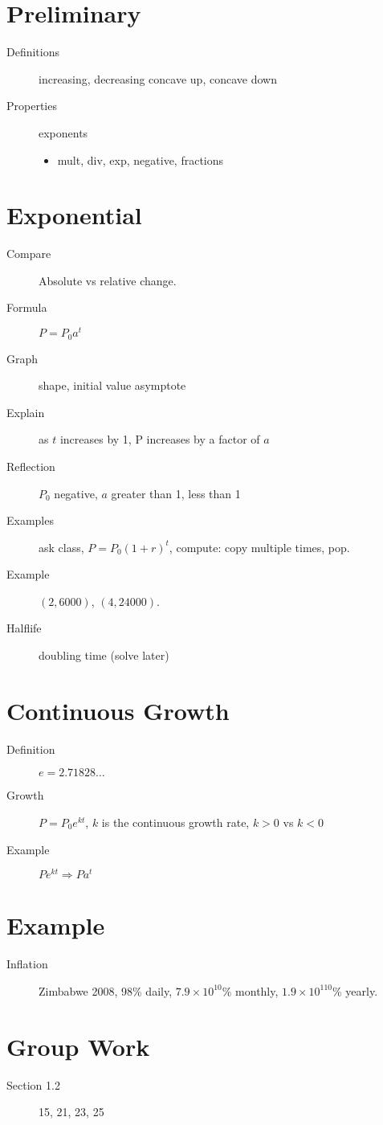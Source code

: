 \documentclass[11pt]{article}
\begin{document}
\drawtitle

\section*{Preliminary}
\begin{description}
\item[Definitions] increasing, decreasing concave up, concave down
\item[Properties] exponents
  \begin{itemize}
  \item mult, div, exp, negative, fractions
  \end{itemize}
\end{description}

\section*{Exponential}
\begin{description}
\item[Compare] Absolute vs relative change.
\item[Formula] $P=P_0a^t$
\item[Graph] shape, initial value asymptote
\item[Explain] as $t$ increases by 1, P increases by a factor of $a$
\item[Reflection] $P_0$ negative, $a$ greater than 1, less than 1
\item[Examples] ask class, $P=P_0(1+r)^t$, compute: copy multiple
  times, pop.
\item[Example] $(2, 6000)$, $(4, 24000)$.
\item[Halflife] doubling time (solve later)
\end{description}

\section*{Continuous Growth}
\begin{description}
\item[Definition] $e=2.71828\dots$
\item[Growth] $P=P_0e^{kt}$, $k$ is the continuous growth rate, $k>0$
  vs $k<0$
\item[Example] $Pe^{kt}\Rightarrow Pa^t$
\end{description}

\section*{Example}
\begin{description}
\item[Inflation] Zimbabwe 2008, 98\% daily, $7.9\times 10^{10}$\%
  monthly, $1.9\times 10^{110}$\% yearly.
\end{description}

\section*{Group Work}
\begin{description}
\item[Section 1.2] 15, 21, 23, 25
\end{description}
\end{document}
